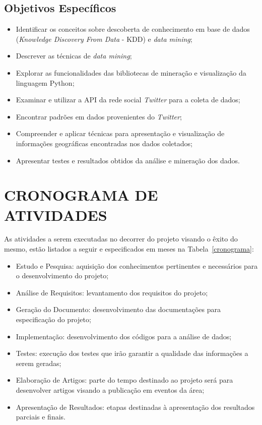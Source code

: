 \subsection{Objetivos Específicos}\label{subsec:objetivos_especificos}
\begin{itemize}
	\item Identificar os conceitos sobre descoberta de conhecimento em base de dados (\textit{Knowledge Discovery From Data} - KDD) e \textit{data mining};
	\item Descrever as técnicas de \textit{data mining};
	\item Explorar as funcionalidades das bibliotecas de mineração e visualização da linguagem Python;
	\item Examinar e utilizar a API da rede social \textit{Twitter} para a coleta de dados;
	\item Encontrar padrões em dados provenientes do \textit{Twitter};
	\item Compreender e aplicar técnicas para apresentação e visualização de informações geográficas encontradas nos dados coletados;
	\item Apresentar testes e resultados obtidos da análise e mineração dos dados.
\end{itemize}

\section{CRONOGRAMA DE ATIVIDADES}\label{subsec:cronograma}

As atividades a serem executadas no decorrer do projeto visando o êxito do mesmo, estão listados a seguir e especificados em meses na Tabela~\ref{cronograma}:

\begin{itemize}
  \item Estudo e Pesquisa: aquisição dos conhecimentos pertinentes e necessários para o desenvolvimento do projeto;
  \item Análise de Requisitos: levantamento dos requisitos do projeto;
  \item Geração do Documento: desenvolvimento das documentações para especificação do projeto;
  \item Implementação: desenvolvimento dos códigos para a análise de dados;
  \item Testes: execução dos testes que irão garantir a qualidade das informações a serem geradas;
  \item Elaboração de Artigos: parte do tempo destinado ao projeto será para desenvolver artigos visando a publicação em eventos da área;
  \item Apresentação de Resultados: etapas destinadas à apresentação dos resultados parciais e finais.
\end{itemize}


